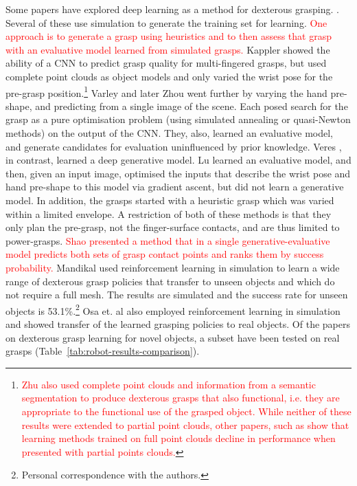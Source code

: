 Some papers have explored deep learning as a method for dexterous grasping. \cite{lu2017planning,varley2015generating,veres2017modeling,zhou20176dof,kappler2015leveraging,Zhu2021,Corsaro2021}. Several of these use simulation to generate the training set for learning. \textcolor{red}{One approach \cite{Corsaro2021} is to generate a grasp using heuristics and to then assess that grasp with an evaluative model learned from simulated grasps.} Kappler \cite{kappler2015leveraging} showed the ability of a CNN to predict grasp quality for multi-fingered grasps, but used complete point clouds as object models and only varied the wrist pose for the pre-grasp position.\footnote{\textcolor{red}{Zhu \cite{Zhu2021} also used complete point clouds and information from a semantic segmentation to produce dexterous grasps that also functional, i.e. they are appropriate to the functional use of the grasped object. While neither of these results were extended to partial point clouds, other papers, such as \cite{kopicki2015ijrr} show that learning methods trained on full point clouds decline in performance when presented with partial points clouds.}} Varley \cite{varley2015generating} and later Zhou \cite{zhou20176dof} went further by varying the hand pre-shape, and predicting from a single image of the scene. Each posed search for the grasp as a pure optimisation problem (using simulated annealing or quasi-Newton methods) on the output of the CNN. They, also, learned an evaluative model, and generate candidates for evaluation uninfluenced by prior knowledge. Veres \cite{veres2017modeling}, in contrast, learned a deep generative model. Lu \cite{lu2017planning} learned an evaluative model, and then, given an input image, optimised the inputs that describe the wrist pose and hand pre-shape to this model via gradient ascent, but did not learn a generative model. In addition, the grasps started with a heuristic grasp which was varied within a limited envelope. A restriction of both of these methods is that they only plan the pre-grasp, not the finger-surface contacts, and are thus limited to power-grasps. \textcolor{red}{Shao \cite{Shao2020} presented a method that in a single generative-evaluative model predicts both sets of grasp contact points and ranks them by success probability.} Mandikal \cite{mandikal2021dexterous} used reinforcement learning in simulation to learn a wide range of dexterous grasp policies that transfer to unseen objects and which do not require a full mesh. The results are simulated and the success rate for unseen objects is 53.1\%.\footnote{Personal correspondence with the authors.} Osa et. al \cite{Osa2018} also employed reinforcement learning in simulation and showed transfer of the learned grasping policies to real objects. Of the papers on dexterous grasp learning for novel objects, a subset have been tested on real grasps (Table~\ref{tab:robot-results-comparison}). 

